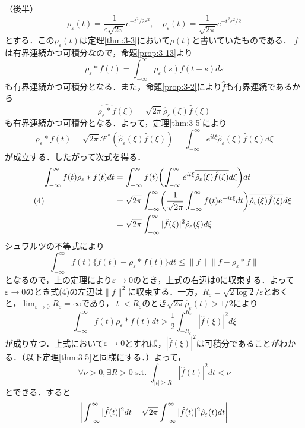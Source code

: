 \documentclass[dvipdfmx,a4j,10pt]{jsarticle}
\makeatletter
\theoremstyle{mystyle1}
\theoremstyle{mystyle3}
\theoremstyle{mystyle4}
\theoremstyle{mystyle6}
\theoremstyle{mystyle2}
\theoremstyle{mystyle5}
\renewenvironment{proof}[1][\proofname]{\par
  \pushQED{\qed}%
  \normalfont
  \topsep6\p@\@plus6\p@ \trivlist
  \item[\hskip\labelsep{\bfseries\sffamily #1}]\ignorespaces
}{%
  \popQED\endtrivlist\@endpefalse
}
\renewcommand\proofname{証明}
\makeatother
\begin{document}
\begin{proof}
	（後半）
	\[
		\rho_\varepsilon(t)=\frac{1}{\varepsilon\sqrt{2\pi}}e^{-t^2/2\varepsilon^2},\quad\hat\rho_\varepsilon(t)=\frac{1}{\sqrt{2\pi}}e^{-t^2\varepsilon^2/2}
	\]
	とする．この$\rho_\varepsilon(t)$は定理\ref{thm:3-3}において$\rho(t)$と書いていたものである．
	$f$は有界連続かつ可積分なので，命題\ref{prop:3-13}より
	\[
		\rho_\varepsilon*f(t)=\int_{-\infty}^\infty \rho_\varepsilon(s)f(t-s)ds
	\]
	も有界連続かつ可積分となる．また，命題\ref{prop:3-2}により$\hat f$も有界連続であるから
	\[
		\widehat{\rho_\varepsilon*f}(\xi)=\sqrt{2\pi}\hat\rho_\varepsilon(\xi)\hat f(\xi)
	\]
	も有界連続かつ可積分となる．よって，定理\ref{thm:3-5}により
	\[
		\rho_\varepsilon*f(t)=\sqrt{2\pi}\mathcal{F}^*(\hat\rho_\varepsilon(\xi)\hat f(\xi))=\int_{-\infty}^\infty e^{it\xi}\hat\rho_\varepsilon(\xi)\hat f(\xi)d\xi
	\]
	が成立する．したがって次式を得る．
	\begin{equation}\tag{4}
		\begin{split}
			\int_{-\infty}^\infty f(t)\overline{\rho_\varepsilon*f(t)}dt
			&=\int_{-\infty}^\infty f(t)\mleft(\int_{-\infty}^\infty e^{it\xi}\overline{\hat\rho_\varepsilon(\xi)\hat f(\xi)}d\xi\mright)dt \\
			&=\sqrt{2\pi}\int_{-\infty}^\infty\mleft(\frac{1}{\sqrt{2\pi}}\int_{-\infty}^\infty f(t)e^{-it\xi}dt\mright)\overline{\hat\rho_\varepsilon(\xi)\hat f(\xi)}d\xi \\
			&=\sqrt{2\pi}\int_{-\infty}^\infty|\hat f(\xi)|^2\hat\rho_\varepsilon(\xi)d\xi
		\end{split}
	\end{equation}
	シュワルツの不等式により
	\[
		\int_{-\infty}^\infty f(t)\{\overline{f(t)-\rho_\varepsilon*f(t)}\}dt\leq\|f\|\|f-\rho_\varepsilon*f\|
	\]
	となるので，上の定理により$\varepsilon\to 0$のとき，上式の右辺は$0$に収束する．よって$\varepsilon\to 0$のとき式(4)の左辺は$\|f\|^2$に収束する．一方，$R_\varepsilon=\sqrt{2\log 2}/\varepsilon$とおくと，$\lim_{\varepsilon\to 0}R_\varepsilon
		=\infty$であり，$|t|<R_\varepsilon$のとき$\sqrt{2\pi}\hat\rho_\varepsilon(t)>1/2$により
	\[
		\int_{-\infty}^\infty f(t)\overline{\rho_\varepsilon*f(t)}dt>\frac{1}{2}\int_{-R_\varepsilon}^{R_\varepsilon}|\hat f(\xi)|^2d\xi
	\]
	が成り立つ．上式において$\varepsilon\to 0$とすれば，$|\hat f(\xi)|^2$は可積分であることがわかる．（以下定理\ref{thm:3-5}と同様にする．）よって，
	\[
		\forall\nu>0,\exists R>0\,\,\textrm{s.t.}\,\,\int_{|t|\geq R}|\hat f(t)|^2dt<\nu
	\]
	とできる．すると
	\[
		\begin{split}
			\mleft|\int_{-\infty}^\infty |\hat f(t)|^2dt-\sqrt{2\pi}\int_{-\infty}^\infty |\hat f(t)|^2\hat\rho_\varepsilon(t)dt\mright|

\end{split}\]
\end{proof}
\end{document}
